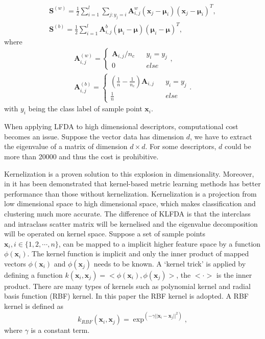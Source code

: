 \documentclass[10pt,twocolumn,letterpaper]{article}
\begin{document}
\begin{equation}
\begin{aligned}
\bm{S}^{(w)} = \frac{1}{2}\sum _{i=1}^l\sum_{j:y_j = i} \bm{A}_{i,j}^w (\bm{x}_j - \bm{\mu}_i)(\bm{x}_j - \bm{\mu}_i)^T, \\
\bm{S}^{(b)} =  \frac{1}{2}\sum _{i=1}^l \bm{A}_{i,j}^b(\bm{\mu}_i - \bm{\mu})(\bm{\mu}_i - \bm{\mu})^T,
\end{aligned}
\end{equation}
where 
\begin{equation}
\begin{aligned}
\bm{A}_{i,j}^{(w)} = \left \{ 
\begin{array}{rcl}
\bm{A}_{i,j}/n_c &  &y_i = y_j \\
0 & & else
\end{array}
  \right., \\
  \bm{A}_{i,j}^{(b)} = \left \{ 
\begin{array}{rcl}
(\frac{1}{n} - \frac{1}{n_c})  \bm{A}_{i,j} &  &{y_i = y_j }\\
\frac{1}{n} & & {else}
\end{array}
  \right..
 \end{aligned}
\end{equation}
with $y_i$ being the class label of sample point $\bm{x}_i$.
  
When applying LFDA to high dimensional descriptors, computational cost becomes an issue. Suppose the vector data has dimension $d$, we have to extract the eigenvalue of a matrix of dimension $d\times d$. For some descriptors, $d$ could be more than 20000 and thus the cost is prohibitive. 
 
 
Kernelization is a proven solution to this explosion in dimensionality. Moreover, in \cite{KernelVersionMetrics} it has been demonstrated that kernel-based metric learning methods has better performance than those without kernelization. Kernelization is a projection from low dimensional space to high dimensional space, which makes classification and clustering much more accurate. The difference of KLFDA is that the interclass and intraclass scatter matrix will be kernelised and the eigenvalue decomposition will be operated on kernel space.  Suppose a set of sample points $\bm{x}_i, i\in\{1,2,\cdots, n\} $, can be mapped to a implicit higher feature space by a function $\phi(\bm{x}_i)$. The kernel function is implicit and only the inner product of mapped vectors $\phi(\bm{x}_i)$ and $\phi(\bm{x}_j)$ needs to be known. A `kernel trick' is applied by defining a function $k(\bm{x}_i,\bm{x}_j) = <\phi(\bm{x}_i),\phi(\bm{x}_j)>$, the $< \cdot >$ is the inner product. There are many types of kernels such as polynomial kernel and radial basis function (RBF) kernel. In this paper the RBF kernel is adopted. A RBF kernel is defined as 
\begin{equation}
k_{RBF}(\bm{x}_i,\bm{x}_j) = \exp^{(-\gamma||\bm{x}_i-\bm{x}_j||^2)}, 
\end{equation}
where $\gamma$ is a constant term.  
\end{document}
